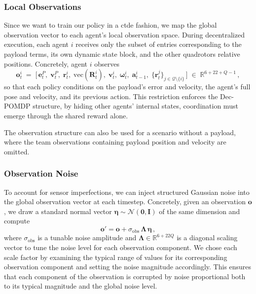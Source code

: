 \subsubsection{Local Observations}
Since we want to train our policy in a \gls{ctde} fashion, we map the global observation vector to each agent's local observation space. During decentralized execution, each agent \(i\) receives only the subset of entries corresponding to the payload terms, its own dynamic state block, and the other quadrotors relative positions.  Concretely, agent \(i\) observes
\begin{equation}
\mathbf{o}^i_t 
\;=\;
\bigl[\,
\mathbf{e}^P_t,\;\mathbf{v}^P_t,\;\mathbf{r}^i_t,\;\mathrm{vec}(\mathbf{R}^i_t),\;\mathbf{v}^i_t,\;\boldsymbol{\omega}^i_t,\;\mathbf{a}^i_{t-1},\;
\{\mathbf{r}^j_t\}_{j \in \mathcal{Q}\setminus\{i\}}
\,\bigr]\;\in\;\mathbb{R}^{6 + 22 + Q - 1}\,,
\end{equation}
so that each policy conditions on the payload's error and velocity, the agent's full pose and velocity, and its previous action. This restriction enforces the Dec-POMDP structure, by hiding other agents' internal states, coordination must emerge through the shared reward alone.

The observation structure can also be used for a scenario without a payload, where the team observations containing payload position and velocity are omitted.
\subsubsection{Observation Noise}
To account for sensor imperfections, we can inject structured Gaussian noise into the global observation vector at each timestep. Concretely, given an observation $\mathbf{o}$, we draw a standard normal vector $\bm{\eta}\sim\mathcal{N}(\mathbf{0},\mathbf{I})$ of the same dimension and compute
\begin{equation}
    \mathbf{o}' = \mathbf{o} + \sigma_{\mathrm{obs}}\,\bm{\Lambda}\,\bm{\eta}\,,
\end{equation}
where $\sigma_{\mathrm{obs}}$ is a tunable noise amplitude and $\bm{\Lambda}\in\mathbb{R}^{6+22Q}$ is a diagonal scaling vector to tune the noise level for each observation component. We chose each scale factor by examining the typical range of values for its corresponding observation component and setting the noise magnitude accordingly. This ensures that each component of the observation is corrupted by noise proportional both to its typical magnitude and the global noise level.
